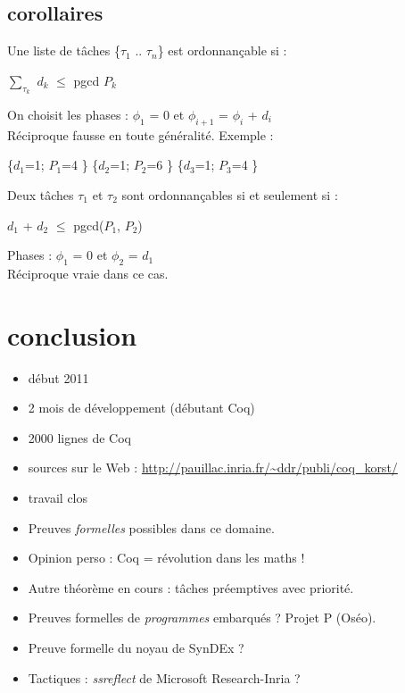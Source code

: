 \documentclass[t]{beamer}
\begin{document}
\subsection{corollaires}

 {

  Une liste de tâches \{$\tau_1$ .. $\tau_n$\} est ordonnançable si :
  \begin{center}
    $\sum_{\tau_k}$ $d_k$ $\le$ pgcd $P_k$
  \end{center}
  On choisit les phases : $\phi_1$ = 0 et $\phi_{i+1}$ = $\phi_i$ + $d_i$ \\
  \vsp
  Réciproque fausse en toute généralité. Exemple :
  \begin{center}
    \{$d_1$=1; $P_1$=4 \}
    \{$d_2$=1; $P_2$=6 \}
    \{$d_3$=1; $P_3$=4 \} \\
    \vsp
  \end{center}
}

 {

  Deux tâches $\tau_1$ et $\tau_2$ sont ordonnançables si et seulement si :
  \begin{center}
    $d_1$ + $d_2$ $\le$ pgcd($P_1$, $P_2$)
  \end{center}
  Phases : $\phi_1$ = 0 et $\phi_2$ = $d_1$ \\
  \vsp
  Réciproque vraie dans ce cas.

}

\section{conclusion}

 {

  \begin{itemize}
  \item début 2011
  \item 2 mois de développement (débutant Coq)
  \item 2000 lignes de Coq
  \item sources sur le Web :
    \url{http://pauillac.inria.fr/~ddr/publi/coq_korst/}
  \item travail clos
  \end{itemize}
  
}

 {

  \begin{itemize}
  \item Preuves {\em formelles} possibles dans ce domaine.
  \item Opinion perso : Coq = révolution dans les maths !
  \item Autre théorème en cours : tâches préemptives avec priorité.
  \item Preuves formelles de {\em programmes} embarqués ? Projet P (Oséo).
  \item Preuve formelle du noyau de SynDEx ?
  \item Tactiques : {\em ssreflect} de Microsoft Research-Inria ?
  \end{itemize}

}
\end{document}
